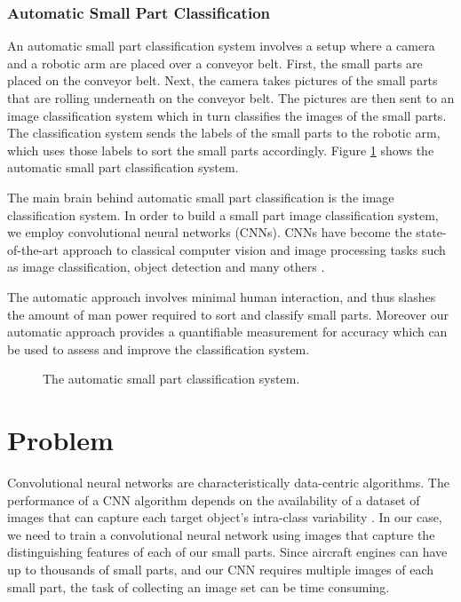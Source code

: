 \subsubsection{Automatic Small Part Classification}

An automatic small part classification system involves a setup where a camera and a robotic arm are placed over a conveyor belt. First, the small parts are placed on the conveyor belt. Next, the camera takes pictures of the small parts that are rolling underneath on the conveyor belt. The pictures are then sent to an image classification system which in turn classifies the images of the small parts. The classification system sends the labels of the small parts to the robotic arm, which uses those labels to sort the small parts accordingly. Figure \ref{fig:automatic_system} shows the automatic small part classification system.

The main brain behind automatic small part classification is the image classification system. In order to build a small part image classification system, we employ convolutional neural networks (CNNs). CNNs have become the state-of-the-art approach to classical computer vision and image processing tasks such as image classification, object detection and many others \cite{ILSVRC15}.

The automatic approach involves minimal human interaction, and thus slashes the amount of man power required to sort and classify small parts. Moreover our automatic approach provides a quantifiable measurement for accuracy which can be used to assess and improve the classification system.

\begin{figure}[H]
\centering
{}
\caption{The automatic small part classification system.}
\label{fig:automatic_system}
\end{figure}


\section{Problem}

Convolutional neural networks are characteristically data-centric algorithms. The performance of a CNN algorithm depends on the availability of a dataset of images that can capture each target object's intra-class variability \cite{krizhevsky2012imagenet}. In our case, we need to train a convolutional neural network using images that capture the distinguishing features of each of our small parts. Since aircraft engines can have up to thousands of small parts, and our CNN requires multiple images of each small part, the task of collecting an image set can be time consuming.

